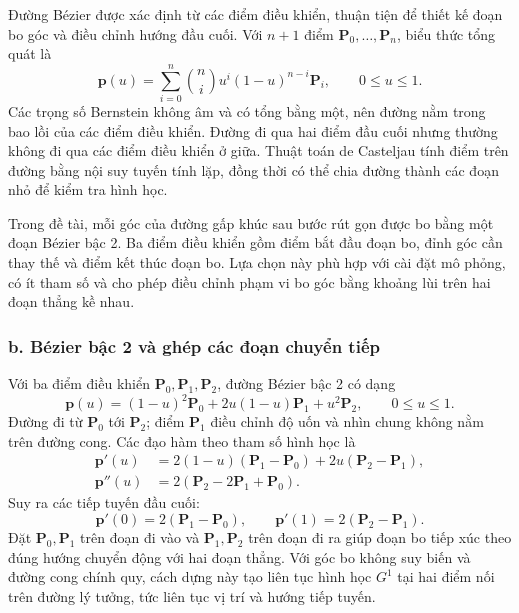 \documentclass[12pt,a4paper,oneside]{report}
\begin{document}
Đường Bézier được xác định từ các điểm điều khiển, thuận tiện để thiết kế đoạn bo góc và điều chỉnh hướng đầu cuối. Với \(n+1\) điểm \(\mathbf P_0,\ldots,\mathbf P_n\), biểu thức tổng quát là
\begin{equation}
  \mathbf p(u)=\sum_{i=0}^{n}\binom ni u^i(1-u)^{n-i}\mathbf P_i,
  \qquad 0\leq u\leq1.
  \label{eq:smooth-bezier}
\end{equation}
Các trọng số Bernstein không âm và có tổng bằng một, nên đường nằm trong bao lồi của các điểm điều khiển. Đường đi qua hai điểm đầu cuối nhưng thường không đi qua các điểm điều khiển ở giữa. Thuật toán de Casteljau tính điểm trên đường bằng nội suy tuyến tính lặp, đồng thời có thể chia đường thành các đoạn nhỏ để kiểm tra hình học.

Trong đề tài, mỗi góc của đường gấp khúc sau bước rút gọn được bo bằng một đoạn Bézier bậc 2. Ba điểm điều khiển gồm điểm bắt đầu đoạn bo, đỉnh góc cần thay thế và điểm kết thúc đoạn bo. Lựa chọn này phù hợp với cài đặt mô phỏng, có ít tham số và cho phép điều chỉnh phạm vi bo góc bằng khoảng lùi trên hai đoạn thẳng kề nhau.

\subsubsection*{b. Bézier bậc 2 và ghép các đoạn chuyển tiếp}

Với ba điểm điều khiển \(\mathbf P_0,\mathbf P_1,\mathbf P_2\), đường Bézier bậc 2 có dạng
\begin{equation}
  \mathbf p(u)=(1-u)^2\mathbf P_0
    +2u(1-u)\mathbf P_1+u^2\mathbf P_2,
  \qquad 0\leq u\leq1.
  \label{eq:smooth-bezier-quadratic}
\end{equation}
Đường đi từ \(\mathbf P_0\) tới \(\mathbf P_2\); điểm \(\mathbf P_1\) điều chỉnh độ uốn và nhìn chung không nằm trên đường cong. Các đạo hàm theo tham số hình học là
\begin{equation}
  \begin{aligned}
    \mathbf p'(u)&=2(1-u)(\mathbf P_1-\mathbf P_0)
                  +2u(\mathbf P_2-\mathbf P_1),\\
    \mathbf p''(u)&=2(\mathbf P_2-2\mathbf P_1+\mathbf P_0).
  \end{aligned}
  \label{eq:smooth-bezier-derivatives}
\end{equation}
Suy ra các tiếp tuyến đầu cuối:
\begin{equation}
  \mathbf p'(0)=2(\mathbf P_1-\mathbf P_0),\qquad
  \mathbf p'(1)=2(\mathbf P_2-\mathbf P_1).
  \label{eq:smooth-bezier-endpoints}
\end{equation}
Đặt \(\mathbf P_0,\mathbf P_1\) trên đoạn đi vào và \(\mathbf P_1,\mathbf P_2\) trên đoạn đi ra giúp đoạn bo tiếp xúc theo đúng hướng chuyển động với hai đoạn thẳng. Với góc bo không suy biến và đường cong chính quy, cách dựng này tạo liên tục hình học \(G^1\) tại hai điểm nối trên đường lý tưởng, tức liên tục vị trí và hướng tiếp tuyến.
\end{document}
